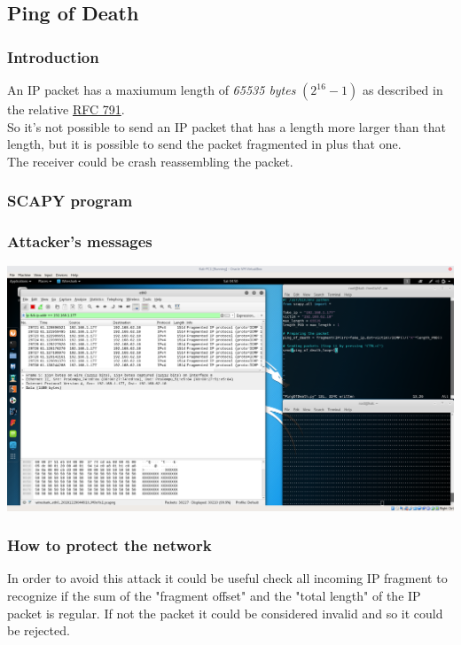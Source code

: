 \subsection{Ping of Death}
\subsubsection{Introduction}
An IP packet has a maxiumum length of \textit{65535 bytes} $(2^{16}-1)$ as described in the relative \href{https://tools.ietf.org/html/rfc791}{RFC 791}.\\
So it's not possible to send an IP packet that has a length more larger than that length, but it is possible to send the packet fragmented in plus that one.\\
The receiver could be crash reassembling the packet.\par

\subsubsection{SCAPY program}


\subsubsection{Attacker's messages}
\includegraphics[width=16cm]{img/PingOfDeath.png}



\subsubsection{How to protect the network}
In order to avoid this attack it could be useful check all incoming IP fragment to recognize if the sum of the "fragment offset" and the "total length" of the IP packet is regular. If not the packet it could be considered invalid and so it could be rejected.\par
